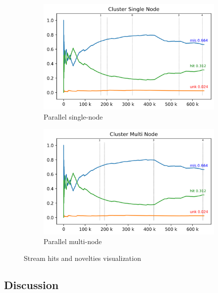 \begin{figure}[hbt]
{\begin{subfigure}{.5\textwidth}
      \includegraphics[width=\linewidth]{experiments/tmi-base.log.png}
      \caption{Parallel single-node}
      \label{fig:cluster-sub-single}
    \end{subfigure}
    \begin{subfigure}{.5\textwidth}
      \centering
      \includegraphics[width=\linewidth]{experiments/tmi-n12.log.png}
      \caption{Parallel multi-node}
      \label{fig:cluster-sub-multi}
    \end{subfigure}
  }
  \caption{Stream hits and novelties visualization}
  \label{fig:visualization}
\end{figure}


\subsection{Discussion}

